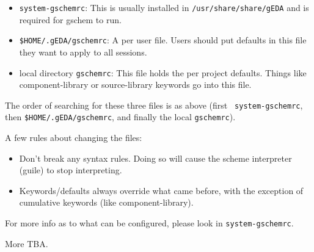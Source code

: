 \documentclass{article}
\begin{document}
\begin{itemize}
\item {\tt system-gschemrc}:  This is usually installed in 
                  {\tt /usr/share/share/gEDA} and is required for gschem to run.

\item {\tt \$HOME/.gEDA/gschemrc}: A per user file.  Users should put
                  defaults in this file they want to apply to all sessions. 

\item local directory {\tt gschemrc}: This file holds the per project
                  defaults.  Things like component-library or source-library
                  keywords go into this file.

\end{itemize}
The order of searching for these three files is as above (first {\tt
  system-gschemrc}, then {\tt \$HOME/.gEDA/gschemrc}, and finally the
local {\tt gschemrc}).

A few rules about changing the files:
\begin{itemize}
\item Don't break any syntax rules.  Doing so will cause the scheme
  interpreter (guile) to stop interpreting.
  
\item Keywords/defaults always override what came before, with the
  exception of cumulative keywords (like component-library).
\end{itemize}

For more info as to what can be configured, please look in
{\tt system-gschemrc}.

More TBA.
        
\end{document}

